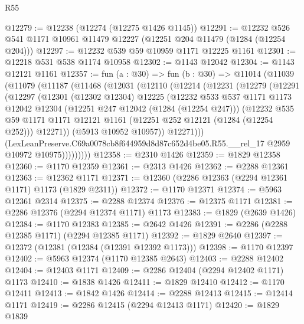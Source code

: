\begin{lexlean}{R55}
\begin{coremodule}
@12279 := @12238 (@12274 (@12275 @1426 @1145))
@12291 := @12232 @526 @541 @1171 @10961 @11479 @12227 (@12251 @204 @11479 (@1284 (@12254 @204)))
@12297 := @12232 @539 @59 @10959 @1171 @12225 @1161
@12301 := @12218 @531 @538 @1174 @10958
@12302 := @1143 @12042
@12304 := @1143 @12121 @1161
@12357 := fun (a : @30) =>
  fun (b : @30) =>
  @11014
    (@11039
      (@11079
        (@11187
          (@11468
            (@12031
              (@12110
                (@12214
                  (@12231
                    (@12279
                      (@12291
                        (@12297
                          (@12301
                            (@12302 @12304)
                            @12225
                            (@12232
                              @533
                              @537
                              @1171
                              @1173
                              @12042
                              @12304
                              (@12251 @247 @12042 (@1284 (@12254 @247)))
                              (@12232
                                @535
                                @59
                                @1171
                                @1171
                                @12121
                                @1161
                                (@12251 @252 @12121 (@1284 (@12254 @252)))
                                @12271))
                            (@5913 @10952 @10957))
                          @12271)))
                    (LexLeanPreserve.C69a0078cb8f644959d8d87c652d4be05.R55.__rel_17
                      @2959
                      @10972
                      @10975)))))))))
@12358 := @2310 @1426
@12359 := @1829 @12358
@12360 := @1170 @12359
@12361 := @2313 @1426
@12362 := @2288 @12361
@12363 := @12362 @1171
@12371 := @12360 (@2286 @12363 (@2294 @12361 @1171) @1173 (@1829 @2311))
@12372 := @1170 @12371
@12374 := @5963 @12361 @2314
@12375 := @2288 @12374
@12376 := @12375 @1171
@12381 := @2286 @12376 (@2294 @12374 @1171) @1173
@12383 := @1829 (@2639 @1426)
@12384 := @1170 @12383
@12385 := @2642 @1426
@12391 := @2286 (@2288 @12385 @1171) (@2294 @12385 @1171)
@12392 := @1829 @2640
@12397 := @12372 (@12381 (@12384 (@12391 @12392 @1173)))
@12398 := @1170 @12397
@12402 := @5963 @12374 (@1170 @12385 @2643)
@12403 := @2288 @12402
@12404 := @12403 @1171
@12409 := @2286 @12404 (@2294 @12402 @1171) @1173
@12410 := @1838 @1426
@12411 := @1829 @12410
@12412 := @1170 @12411
@12413 := @1842 @1426
@12414 := @2288 @12413
@12415 := @12414 @1171
@12419 := @2286 @12415 (@2294 @12413 @1171)
@12420 := @1829 @1839

\end{coremodule}
\end{lexlean}
